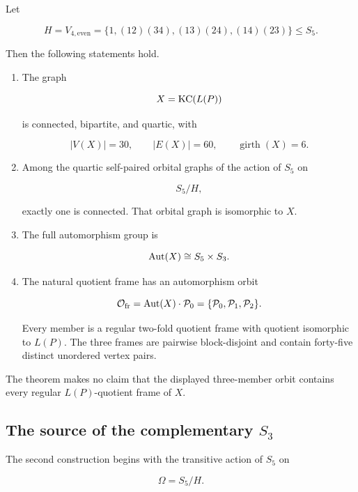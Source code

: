 \begin{theorem}
\label{thm:introduction-main}

Let

\[
H=V_{4,\mathrm{even}}
=
\{
1,
(12)(34),
(13)(24),
(14)(23)
\}
\leq S_5.
\]

Then the following statements hold.

\begin{enumerate}[label=\textup{(\roman*)}]

\item
The graph

\[
X=\operatorname{KC}(L(P))
\]

is connected, bipartite, and quartic, with

\[
|V(X)|=30,
\qquad
|E(X)|=60,
\qquad
\operatorname{girth}(X)=6.
\]

\item
Among the quartic self-paired orbital graphs of the action of \(S_5\) on

\[
S_5/H,
\]

exactly one is connected. That orbital graph is isomorphic to \(X\).

\item
The full automorphism group is

\[
\operatorname{Aut}(X)\cong S_5\times S_3.
\]

\item
The natural quotient frame has an automorphism orbit

\[
\mathcal O_{\mathrm{fr}}
=
\operatorname{Aut}(X)\cdot\mathcal P_0
=
\{
\mathcal P_0,
\mathcal P_1,
\mathcal P_2
\}.
\]

Every member is a regular two-fold quotient frame with quotient
isomorphic to \(L(P)\). The three frames are pairwise block-disjoint and
contain forty-five distinct unordered vertex pairs.

\end{enumerate}
\end{theorem}

The theorem makes no claim that the displayed three-member orbit contains
every regular \(L(P)\)-quotient frame of \(X\).

\subsection{The source of the complementary \(S_3\)}

The second construction begins with the transitive action of \(S_5\) on

\[
\Omega=S_5/H.
\]

